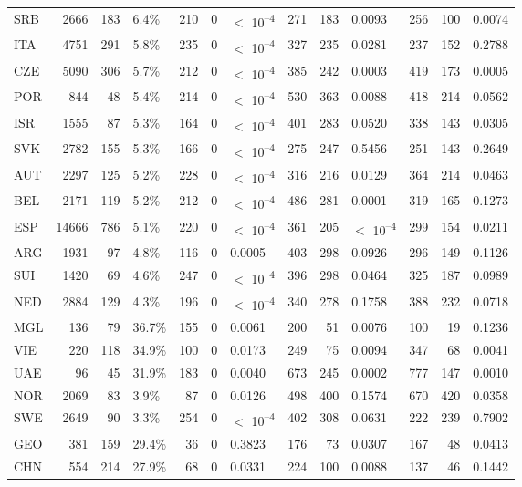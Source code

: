 \begin{tabular}[t]{lrrlrrlrrlrrl}
SRB & 2666 & 183 & 6.4\% & 210 & 0 & $<$ 10\textsuperscript{--4} & 271 & 183 & 0.0093 & 256 & 100 & 0.0074\\
ITA & 4751 & 291 & 5.8\% & 235 & 0 & $<$ 10\textsuperscript{--4} & 327 & 235 & 0.0281 & 237 & 152 & 0.2788\\
CZE & 5090 & 306 & 5.7\% & 212 & 0 & $<$ 10\textsuperscript{--4} & 385 & 242 & 0.0003 & 419 & 173 & 0.0005\\
POR & 844 & 48 & 5.4\% & 214 & 0 & $<$ 10\textsuperscript{--4} & 530 & 363 & 0.0088 & 418 & 214 & 0.0562\\
ISR & 1555 & 87 & 5.3\% & 164 & 0 & $<$ 10\textsuperscript{--4} & 401 & 283 & 0.0520 & 338 & 143 & 0.0305\\
SVK & 2782 & 155 & 5.3\% & 166 & 0 & $<$ 10\textsuperscript{--4} & 275 & 247 & 0.5456 & 251 & 143 & 0.2649\\
AUT & 2297 & 125 & 5.2\% & 228 & 0 & $<$ 10\textsuperscript{--4} & 316 & 216 & 0.0129 & 364 & 214 & 0.0463\\
BEL & 2171 & 119 & 5.2\% & 212 & 0 & $<$ 10\textsuperscript{--4} & 486 & 281 & 0.0001 & 319 & 165 & 0.1273\\
ESP & 14666 & 786 & 5.1\% & 220 & 0 & $<$ 10\textsuperscript{--4} & 361 & 205 & $<$ 10\textsuperscript{--4} & 299 & 154 & 0.0211\\
ARG & 1931 & 97 & 4.8\% & 116 & 0 & 0.0005 & 403 & 298 & 0.0926 & 296 & 149 & 0.1126\\
SUI & 1420 & 69 & 4.6\% & 247 & 0 & $<$ 10\textsuperscript{--4} & 396 & 298 & 0.0464 & 325 & 187 & 0.0989\\
NED & 2884 & 129 & 4.3\% & 196 & 0 & $<$ 10\textsuperscript{--4} & 340 & 278 & 0.1758 & 388 & 232 & 0.0718\\
MGL & 136 & 79 & 36.7\% & 155 & 0 & 0.0061 & 200 & 51 & 0.0076 & 100 & 19 & 0.1236\\
VIE & 220 & 118 & 34.9\% & 100 & 0 & 0.0173 & 249 & 75 & 0.0094 & 347 & 68 & 0.0041\\
UAE & 96 & 45 & 31.9\% & 183 & 0 & 0.0040 & 673 & 245 & 0.0002 & 777 & 147 & 0.0010\\
NOR & 2069 & 83 & 3.9\% & 87 & 0 & 0.0126 & 498 & 400 & 0.1574 & 670 & 420 & 0.0358\\
SWE & 2649 & 90 & 3.3\% & 254 & 0 & $<$ 10\textsuperscript{--4} & 402 & 308 & 0.0631 & 222 & 239 & 0.7902\\
GEO & 381 & 159 & 29.4\% & 36 & 0 & 0.3823 & 176 & 73 & 0.0307 & 167 & 48 & 0.0413\\
CHN & 554 & 214 & 27.9\% & 68 & 0 & 0.0331 & 224 & 100 & 0.0088 & 137 & 46 & 0.1442\\

\end{tabular}
